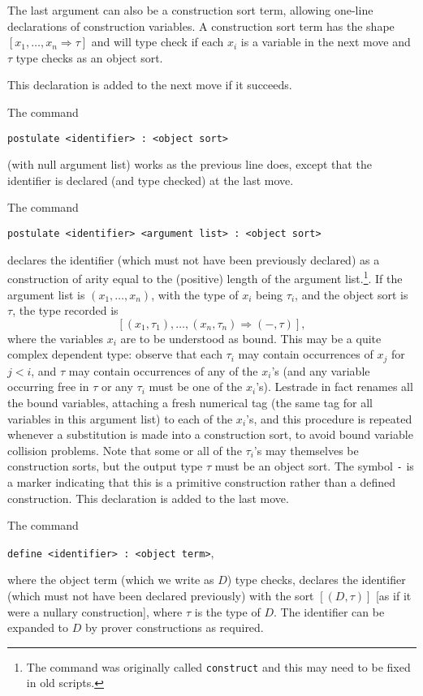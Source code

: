 \documentclass[12pt]{article}
\begin{document}
\begin{description}
The last argument can also be a construction sort term, allowing one-line declarations of construction variables.  A construction sort term has the shape
$[x_1,\ldots,x_n \Rightarrow \tau]$ and will type check if each $x_i$ is a variable in the next move and $\tau$ type checks as an object sort.

This declaration is added to the next move if it succeeds.

\item[constructing an object:]  The command \begin{center}{\tt postulate <identifier> : <object sort>}\end{center} (with null argument list) works as the previous line does, except that the identifier is declared (and type checked) at the last move.

\item[general semantics of the postulate command:]  The command \begin{center}{\tt postulate <identifier> <argument list> : <object sort>}\end{center} declares the identifier (which must not have been previously declared) as a construction of arity equal to the (positive) length of the argument list.\footnote{The command was originally called {\tt construct} and this may need to be fixed in old scripts.}.  If the argument list
is $(x_1,\ldots,x_n)$, with the type of $x_i$ being $\tau_i$,  and the object sort is $\tau$,  the type recorded is $$[(x_1,\tau_1),\ldots,(x_n,\tau_n) \Rightarrow (-,\tau)],$$ where
the variables $x_i$ are to be understood as bound.   This may be a quite complex dependent type:  observe that each $\tau_i$ may contain occurrences of $x_j$ for $j<i$,
and $\tau$ may contain occurrences of any of the $x_i$'s (and any variable occurring free in $\tau$ or any $\tau_i$ must be one of the $x_i$'s).  Lestrade in fact renames all the bound variables, attaching a fresh numerical tag (the same tag for all variables in this argument list) to each of the $x_i$'s, and this procedure is repeated whenever a substitution is made into a construction sort, to avoid bound variable collision problems.
Note that some or all of the $\tau_i$'s may themselves be construction sorts, but the output type $\tau$ must be an object sort.  The symbol {\tt -} is a marker indicating that this is a primitive construction rather than a defined construction.  This declaration is added to the last move.

\item[defining an object:]  The command \begin{center}{\tt define <identifier> : <object term>},\end{center} where the object term (which we write as $D$)  type checks, declares the identifier (which must not have been declared previously)  with the sort $[(D,\tau)]$ [as if it were a nullary construction],
where $\tau$ is the type of $D$.   The identifier can be expanded to $D$ by prover constructions as required. 


\end{description}
\end{document}
